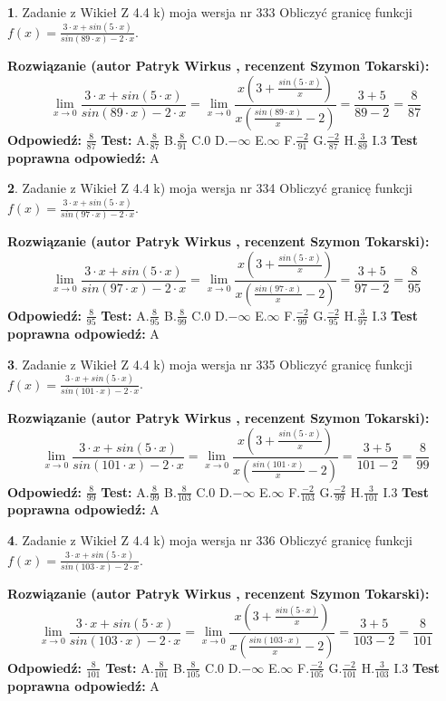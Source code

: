 \documentclass[12pt, a4paper]{article}
\theoremstyle{definition} %
\newtheorem{zad}{}
\newcommand{\zadStart}[1]{\begin{zad}#1\newline}
\newcommand{\zadStop}{\end{zad}}
\newcommand{\rozwStart}[2]{\noindent \textbf{Rozwiązanie (autor #1 , recenzent #2): }\newline}
\newcommand{\rozwStop}{\newline}
\newcommand{\odpStart}{\noindent \textbf{Odpowiedź:}\newline}
\newcommand{\odpStop}{\newline}
\newcommand{\testStart}{\noindent \textbf{Test:}\newline}
\newcommand{\testStop}{\newline}
\newcommand{\kluczStart}{\noindent \textbf{Test poprawna odpowiedź:}\newline}
\newcommand{\kluczStop}{\newline}
\begin{document}
\zadStart{Zadanie z Wikieł Z 4.4 k) moja wersja nr 333}
Obliczyć granicę funkcji $f(x)=\frac{3\cdot x +sin(5\cdot x)}{sin(89\cdot x) -2\cdot x}$.
\zadStop
\rozwStart{Patryk Wirkus}{Szymon Tokarski}
$$\lim\limits_{x\to 0}\frac{3\cdot x +sin(5\cdot x)}{sin(89\cdot x) -2\cdot x}
=\lim\limits_{x\to 0}\frac{x(3+\frac{sin(5\cdot x)}{x})}{x(\frac{sin(89\cdot x)}{x}-2)}
=\frac{3+5}{89-2} = \frac{8}{87}$$
\rozwStop
\odpStart
$\frac{8}{87}$
\odpStop
\testStart
A.$\frac{8}{87}$
B.$\frac{8}{91}$
C.$0$
D.$-\infty$
E.$\infty$
F.$\frac{-2}{91}$
G.$\frac{-2}{87}$
H.$\frac{3}{89}$
I.$3$
\testStop
\kluczStart
A
\kluczStop



\zadStart{Zadanie z Wikieł Z 4.4 k) moja wersja nr 334}
Obliczyć granicę funkcji $f(x)=\frac{3\cdot x +sin(5\cdot x)}{sin(97\cdot x) -2\cdot x}$.
\zadStop
\rozwStart{Patryk Wirkus}{Szymon Tokarski}
$$\lim\limits_{x\to 0}\frac{3\cdot x +sin(5\cdot x)}{sin(97\cdot x) -2\cdot x}
=\lim\limits_{x\to 0}\frac{x(3+\frac{sin(5\cdot x)}{x})}{x(\frac{sin(97\cdot x)}{x}-2)}
=\frac{3+5}{97-2} = \frac{8}{95}$$
\rozwStop
\odpStart
$\frac{8}{95}$
\odpStop
\testStart
A.$\frac{8}{95}$
B.$\frac{8}{99}$
C.$0$
D.$-\infty$
E.$\infty$
F.$\frac{-2}{99}$
G.$\frac{-2}{95}$
H.$\frac{3}{97}$
I.$3$
\testStop
\kluczStart
A
\kluczStop



\zadStart{Zadanie z Wikieł Z 4.4 k) moja wersja nr 335}
Obliczyć granicę funkcji $f(x)=\frac{3\cdot x +sin(5\cdot x)}{sin(101\cdot x) -2\cdot x}$.
\zadStop
\rozwStart{Patryk Wirkus}{Szymon Tokarski}
$$\lim\limits_{x\to 0}\frac{3\cdot x +sin(5\cdot x)}{sin(101\cdot x) -2\cdot x}
=\lim\limits_{x\to 0}\frac{x(3+\frac{sin(5\cdot x)}{x})}{x(\frac{sin(101\cdot x)}{x}-2)}
=\frac{3+5}{101-2} = \frac{8}{99}$$
\rozwStop
\odpStart
$\frac{8}{99}$
\odpStop
\testStart
A.$\frac{8}{99}$
B.$\frac{8}{103}$
C.$0$
D.$-\infty$
E.$\infty$
F.$\frac{-2}{103}$
G.$\frac{-2}{99}$
H.$\frac{3}{101}$
I.$3$
\testStop
\kluczStart
A
\kluczStop



\zadStart{Zadanie z Wikieł Z 4.4 k) moja wersja nr 336}
Obliczyć granicę funkcji $f(x)=\frac{3\cdot x +sin(5\cdot x)}{sin(103\cdot x) -2\cdot x}$.
\zadStop
\rozwStart{Patryk Wirkus}{Szymon Tokarski}
$$\lim\limits_{x\to 0}\frac{3\cdot x +sin(5\cdot x)}{sin(103\cdot x) -2\cdot x}
=\lim\limits_{x\to 0}\frac{x(3+\frac{sin(5\cdot x)}{x})}{x(\frac{sin(103\cdot x)}{x}-2)}
=\frac{3+5}{103-2} = \frac{8}{101}$$
\rozwStop
\odpStart
$\frac{8}{101}$
\odpStop
\testStart
A.$\frac{8}{101}$
B.$\frac{8}{105}$
C.$0$
D.$-\infty$
E.$\infty$
F.$\frac{-2}{105}$
G.$\frac{-2}{101}$
H.$\frac{3}{103}$
I.$3$
\testStop
\kluczStart
A
\kluczStop
\end{document}
